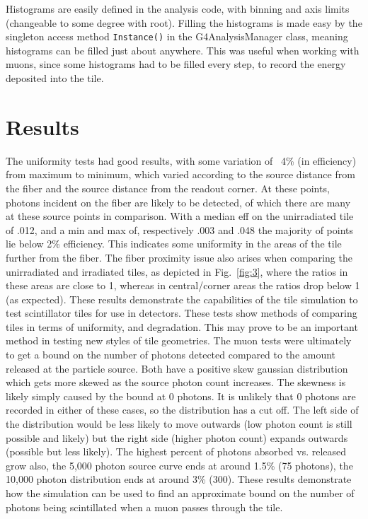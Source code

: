 	Histograms are easily defined in the analysis code, with binning and axis limits (changeable to some degree with root). Filling the histograms is made easy by the singleton access method \verb|Instance()| in the G4AnalysisManager class, meaning histograms can be filled just about anywhere. This was useful when working with muons, since some histograms had to be filled every step, to record the energy deposited into the tile. 


\section{Results}
	The uniformity tests had good results, with some variation of ~4\% (in efficiency) from maximum to minimum, which varied according to the source distance from the fiber and the source distance from the readout corner. At these points, photons incident on the fiber are likely to be detected, of which there are many at these source points in comparison. With a median eff on the unirradiated tile of .012, and a min and max of, respectively .003 and .048 the majority of points lie below 2\% efficiency. This indicates some uniformity in the areas of the tile further from the fiber. The fiber proximity issue also arises when comparing the unirradiated and irradiated tiles, as depicted in Fig.~\ref{fig:3}, where the ratios in these areas are close to 1, whereas in central/corner areas the ratios drop below 1 (as expected). These results demonstrate the capabilities of the tile simulation to test scintillator tiles for use in detectors. These tests show methods of comparing tiles in terms of uniformity, and degradation. This may prove to be an important method in testing new styles of tile geometries.
	The muon tests were ultimately to get a bound on the number of photons detected compared to the amount released at the particle source.  Both have a positive skew gaussian distribution which gets more skewed as the source photon count increases. The skewness is likely simply caused by the bound at 0 photons. It is unlikely that 0 photons are recorded in either of these cases, so the distribution has a cut off. The left side of the distribution would be less likely to move outwards (low photon count is still possible and likely) but the right side (higher photon count) expands outwards (possible but less likely). The highest percent of photons absorbed vs. released grow also, the 5,000 photon source curve ends at around 1.5\% (75 photons), the 10,000 photon distribution ends at around 3\% (300).  These results demonstrate how the simulation can be used to find an approximate bound on the number of photons being scintillated when a muon passes through the tile. 


\clearpage
\appendix